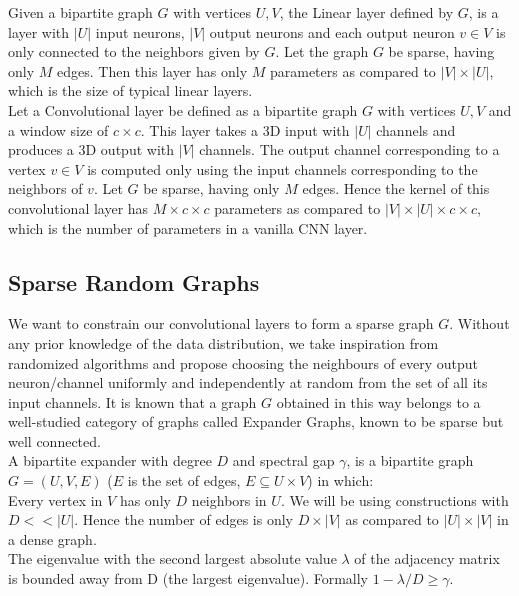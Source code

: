  Given a bipartite graph $G$ with vertices $U, V$, the Linear layer defined by $G$, is a layer with $|U|$ input neurons, $|V|$ output neurons and each output neuron $v \in V$ is only connected to the neighbors given by $G$. Let the graph $G$ be sparse, having only $M$ edges. Then this layer has only $M$ parameters as compared to $|V|\times |U|$, which is the size of typical linear layers. \\
 Let a Convolutional layer be defined as a bipartite graph $G$ with vertices $U,V$ and a window size of $c\times c$. This layer takes a 3D input with $|U|$ channels and produces a 3D output with $|V|$ channels. The output channel corresponding to a vertex $v \in V$ is computed only using the input channels corresponding to the neighbors of $v$. Let $G$ be sparse, having only $M$ edges. Hence the kernel of this convolutional layer has $M \times c \times c$ parameters as compared to $|V|\times |U| \times c \times c$, which is the number of parameters in a vanilla CNN layer.

\subsection{Sparse Random Graphs}

\noindent We want to constrain  our convolutional layers to form a sparse graph $G$. Without any prior knowledge of the data distribution, we take inspiration from randomized algorithms and propose choosing the neighbours of every output neuron/channel uniformly and independently at random from the set of all its input channels. It is known that a graph $G$ obtained in this way belongs to a well-studied category of graphs called Expander Graphs, known to be sparse but well connected. \\

 A bipartite expander with degree $D$ and spectral gap $\gamma$, is a bipartite graph $G=(U,V,E)$ ($E$ is the set of edges,  $ E \subseteq U\times V$) in which: \\

 Every vertex in $V$ has only $D$ neighbors in $U$. We  will be using constructions with $D << |U|$. Hence the number of edges is only $D \times |V|$ as compared to $|U| \times |V|$ in a dense graph.\\

 The eigenvalue with  the second largest absolute value $\lambda$ of the adjacency matrix is bounded away from D (the largest eigenvalue). Formally $1-\lambda/D \geq \gamma.$\\

